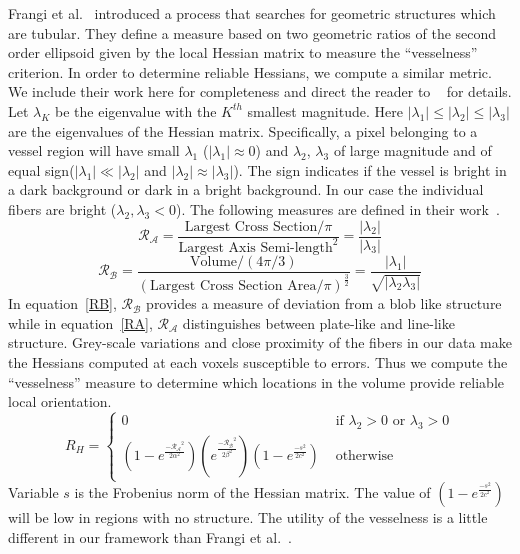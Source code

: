 Frangi et al.~\cite{Frangi1998} introduced a process that searches for geometric structures which are tubular. They define a measure based on two geometric ratios of the second order ellipsoid given by the local Hessian matrix to measure the ``vesselness'' criterion.  In order to determine reliable Hessians, we compute a similar metric. We include their work here for completeness and direct the reader to ~\cite{Frangi1998} for details. Let $\lambda_{K}$ be the eigenvalue with the $K^{th}$ smallest magnitude. Here $|{\lambda}_{1}| \leq| {\lambda}_{2}|\leq| {\lambda}_{3}| $ are the eigenvalues of the Hessian matrix. Specifically, a pixel belonging to a vessel region will have small $\lambda_{1}$ ($|\lambda_{1}|\approx 0$) and $\lambda_{2}$, $\lambda_{3}$ of large magnitude and of equal sign($|\lambda_{1}| \ll |\lambda_{2}|$ and $|\lambda_{2}|\approx |\lambda_{3}|$). The sign indicates if the vessel is bright in a dark background or dark in a bright background. In our case the individual fibers are bright ($\lambda_2,\lambda_3 < 0$).  The following measures are defined in their work~\cite{Frangi1998}.  
\begin{equation}\label{RA}
\mathcal{R_{A}}=\frac{\textrm{Largest  Cross Section}\big/ \pi}{{\textrm{Largest Axis Semi-length}}^{2}}=\frac{|\lambda_{2}|}{|\lambda_{3}|}
\end{equation}
\begin{equation}\label{RB}
\mathcal{R_{B}}=\frac{\textrm{Volume}\big/ (4\pi \big/ 3)}{{(\textrm{Largest Cross Section Area}\big/ \pi)}^{\frac{3}{2}}}=\frac{|\lambda_{1}|}{\sqrt{|\lambda_{2}\lambda_{3}|}}
\end{equation}
In equation~\ref{RB}, $\mathcal{R_{B}}$ provides a measure of deviation from a blob like structure while in equation~\ref{RA}, $\mathcal{R_{A}}$ distinguishes between plate-like and line-like structure. Grey-scale variations and close proximity of the fibers in our data make the Hessians computed at each voxels susceptible to errors. Thus we compute the ``vesselness'' measure to determine which locations in the volume provide reliable local orientation.
$$
R_{H} = \left\{ \begin{array}{ccc}
 0 & \mbox{ if $\lambda_{2}>0$ or $\lambda_{3}>0$} \\
  (1-e^{\frac{\mathcal{-R_{A}}^{2}}{2\alpha^{2}}})
  (e^{\frac{\mathcal{-R_{B}}^{2}}{2\beta^{2}}}) (1-e^{\frac{-s^2}{2c^2}}) &\mbox{ otherwise}
       \end{array} \right.
$$
Variable $s$ is the Frobenius norm of the Hessian matrix. The value  of $(1-e^{\frac{-s^2}{2c^2}})$ will be low in regions with no structure. The utility of the vesselness is a little different in our framework than Frangi et al.~\cite{Frangi1998}.
